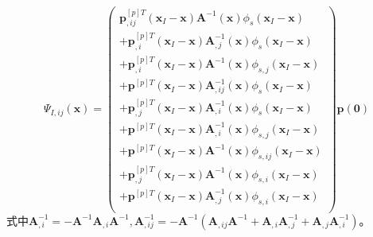\begin{equation}
    \Psi_{I,ij}(\pmb{x})=\left( \begin{aligned}
    \pmb p_{,ij}^{[p]T}(\pmb x_I-\pmb x)\pmb A^{-1}(\pmb x)\phi_s(\pmb x_I-\pmb x)\\
    +\pmb p_{,i}^{[p]T}(\pmb x_I-\pmb x)\pmb A_{,j}^{-1}(\pmb x)\phi_s(\pmb x_I-\pmb x)\\
    +\pmb p_{,i}^{[p]T}(\pmb x_I-\pmb x)\pmb A^{-1}(\pmb x)\phi_{s,j}(\pmb x_I-\pmb x)\\
    +\pmb p^{[p]T}(\pmb x_I-\pmb x)\pmb A_{,ij}^{-1}(\pmb x)\phi_s(\pmb x_I-\pmb x)\\
    +\pmb p_{,j}^{[p]T}(\pmb x_I-\pmb x)\pmb A_{,i}^{-1}(\pmb x)\phi_s(\pmb x_I-\pmb x)\\
    +\pmb p^{[p]T}(\pmb x_I-\pmb x)\pmb A_{,i}^{-1}(\pmb x)\phi_{s,j}(\pmb x_I-\pmb x)\\
    +\pmb p^{[p]T}(\pmb x_I-\pmb x)\pmb A^{-1}(\pmb x)\phi_{s,ij}(\pmb x_I-\pmb x)\\
    +\pmb p_{,j}^{[p]T}(\pmb x_I-\pmb x)\pmb A^{-1}(\pmb x)\phi_{s,i}(\pmb x_I-\pmb x)\\
    +\pmb p^{[p]T}(\pmb x_I-\pmb x)\pmb A_{,j}^{-1}(\pmb x)\phi_{s,i}(\pmb x_I-\pmb x)\\
   \end{aligned} \right)
    \pmb p(\pmb 0)
\end{equation}
式中$\pmb A_{,i}^{-1}=-\pmb A^{-1}\pmb A_{,i}\pmb A^{-1},\pmb A_{,ij}^{-1}=-\pmb A^{-1}(\pmb A_{,ij}\pmb A^{-1}+\pmb A_{,i}\pmb A_{,j}^{-1}+\pmb A_{,j}\pmb A_{,i}^{-1})$。\par

